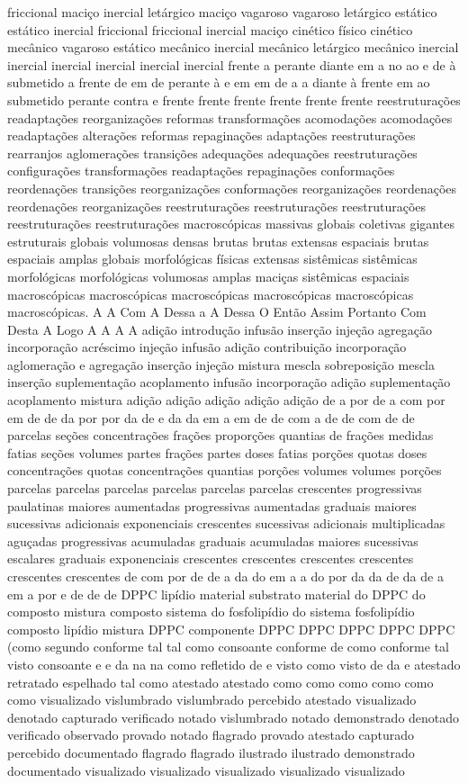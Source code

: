 friccional maciço inercial letárgico maciço vagaroso vagaroso letárgico estático estático inercial friccional friccional inercial maciço cinético físico cinético mecânico vagaroso estático mecânico inercial mecânico letárgico mecânico inercial inercial inercial inercial inercial inercial frente a perante diante em a no ao e de à submetido a frente de em de perante à e em em de a a diante à frente em ao submetido perante contra e frente frente frente frente frente frente reestruturações readaptações reorganizações reformas transformações acomodações acomodações readaptações alterações reformas repaginações adaptações reestruturações rearranjos aglomerações transições adequações adequações reestruturações configurações transformações readaptações repaginações conformações reordenações transições reorganizações conformações reorganizações reordenações reordenações reorganizações reestruturações reestruturações reestruturações reestruturações reestruturações macroscópicas massivas globais coletivas gigantes estruturais globais volumosas densas brutas brutas extensas espaciais brutas espaciais amplas globais morfológicas físicas extensas sistêmicas sistêmicas morfológicas morfológicas volumosas amplas maciças sistêmicas espaciais macroscópicas macroscópicas macroscópicas macroscópicas macroscópicas macroscópicas. A A Com A Dessa a A Dessa O Então Assim Portanto Com Desta A Logo A A A A adição introdução infusão inserção injeção agregação incorporação acréscimo injeção infusão adição contribuição incorporação aglomeração e agregação inserção injeção mistura mescla sobreposição mescla inserção suplementação acoplamento infusão incorporação adição suplementação acoplamento mistura adição adição adição adição adição de a por de a com por em de de da por por da de e da da em a em de de com a de de com de de parcelas seções concentrações frações proporções quantias de frações medidas fatias seções volumes partes frações partes doses fatias porções quotas doses concentrações quotas concentrações quantias porções volumes volumes porções parcelas parcelas parcelas parcelas parcelas parcelas crescentes progressivas paulatinas maiores aumentadas progressivas aumentadas graduais maiores sucessivas adicionais exponenciais crescentes sucessivas adicionais multiplicadas aguçadas progressivas acumuladas graduais acumuladas maiores sucessivas escalares graduais exponenciais crescentes crescentes crescentes crescentes crescentes crescentes de com por de de a da do em a a do por da da de da de a em a por e de de de DPPC lipídio material substrato material do DPPC do composto mistura composto sistema do fosfolipídio do sistema fosfolipídio composto lipídio mistura DPPC componente DPPC DPPC DPPC DPPC DPPC (como segundo conforme tal tal como consoante conforme de como conforme tal visto consoante e e da na na como refletido de e visto como visto de da e atestado retratado espelhado tal como atestado atestado como como como como como como visualizado vislumbrado vislumbrado percebido atestado visualizado denotado capturado verificado notado vislumbrado notado demonstrado denotado verificado observado provado notado flagrado provado atestado capturado percebido documentado flagrado flagrado ilustrado ilustrado demonstrado documentado visualizado visualizado visualizado visualizado visualizado 